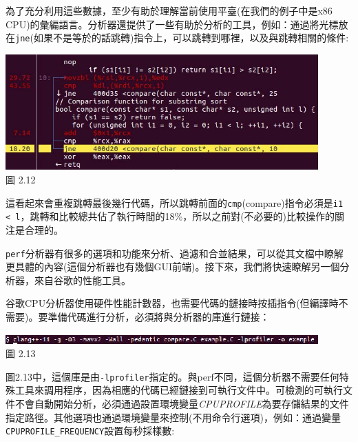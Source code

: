為了充分利用這些數據，至少有助於理解當前使用平臺(在我們的例子中是x86 CPU)的彙編語言。分析器還提供了一些有助於分析的工具，例如：通過將光標放在\texttt{jne}(如果不是等於的話跳轉)指令上，可以跳轉到哪裡，以及與跳轉相關的條件:

\begin{center}
\includegraphics[width=0.9\textwidth]{content/1/chapter2/images/12.jpg}\\
圖 2.12
\end{center}

這看起來會重複跳轉最後幾行代碼，所以跳轉前面的\texttt{cmp}(compare)指令必須是\texttt{i1 < l}，跳轉和比較總共佔了執行時間的18\%，所以之前對(不必要的)比較操作的關注是合理的。

\texttt{perf}分析器有很多的選項和功能來分析、過濾和合並結果，可以從其文檔中瞭解更具體的內容(這個分析器也有幾個GUI前端)。接下來，我們將快速瞭解另一個分析器，來自谷歌的性能工具。


谷歌CPU分析器使用硬件性能計數器，也需要代碼的鏈接時按插指令(但編譯時不需要)。要準備代碼進行分析，必須將與分析器的庫進行鏈接：

\begin{center}
\includegraphics[width=0.9\textwidth]{content/1/chapter2/images/13.jpg}\\
圖 2.13
\end{center}

圖2.13中，這個庫是由\texttt{-lprofiler}指定的。與perf不同，這個分析器不需要任何特殊工具來調用程序，因為相應的代碼已經鏈接到可執行文件中。可檢測的可執行文件不會自動開始分析，必須通過設置環境變量\textit{CPUPROFILE}為要存儲結果的文件指定路徑。其他選項也通過環境變量來控制(不用命令行選項)，例如：通過變量\texttt{CPUPROFILE\_FREQUENCY}設置每秒採樣數:

